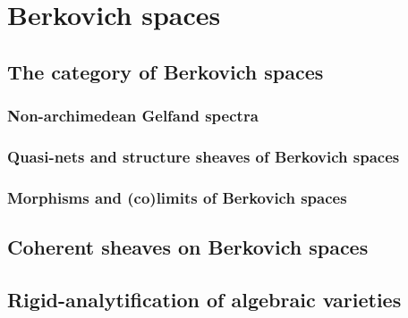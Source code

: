 \section{Berkovich spaces}
    \subsection{The category of Berkovich spaces}
        \subsubsection{Non-archimedean Gelfand spectra}
        
        \subsubsection{Quasi-nets and structure sheaves of Berkovich spaces}
        
        \subsubsection{Morphisms and (co)limits of Berkovich spaces}
    
    \subsection{Coherent sheaves on Berkovich spaces}
    
    \subsection{Rigid-analytification of algebraic varieties}